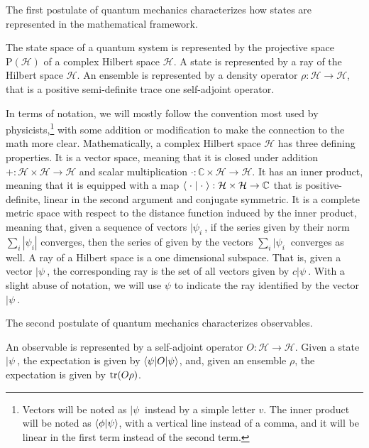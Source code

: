 The first postulate of quantum mechanics characterizes how states are represented in the mathematical framework.
\renewcommand{\thepostulate}{ST}
\begin{postulate}\label{rp_qm_postState}
	The state space of a quantum system is represented by the projective space $\mathrm{P}(\mathcal{H})$ of a complex Hilbert space $\mathcal{H}$. A state is represented by a ray of the Hilbert space $\mathcal{H}$. An ensemble is represented by a density operator $\rho : \mathcal{H} \to \mathcal{H}$, that is a positive semi-definite trace one self-adjoint operator.
\end{postulate}
\renewcommand{\thepostulate}{\Roman{assump}}
In terms of notation, we will mostly follow the convention most used by physicists,\footnote{Vectors will be noted as $|\psi\>$ instead by a simple letter $v$. The inner product will be noted as $\langle \phi | \psi \rangle $, with a vertical line instead of a comma, and it will be linear in the first term instead of the second term. } with some addition or modification to make the connection to the math more clear. Mathematically, a complex Hilbert space $\mathcal{H}$ has three defining properties. It is a vector space, meaning that it is closed under addition $+ : \mathcal{H} \times \mathcal{H} \to \mathcal{H}$ and scalar multiplication $\cdot : \mathbb{C} \times \mathcal{H} \to \mathcal{H}$. It has an inner product, meaning that it is equipped with a map $\langle \; \cdot \; | \; \cdot \; \rangle : \mathcal{H} \times \mathcal{H} \to \mathbb{C}$ that is positive-definite, linear in the second argument and conjugate symmetric. It is a complete metric space with respect to the distance function induced by the inner product, meaning that, given a sequence of vectors $|\psi_i\>$, if the series given by their norm $\sum_i |\psi_i|$ converges, then the series of given by the vectors $\sum_i |\psi_i\>$ converges as well. A ray of a Hilbert space is a one dimensional subspace. That is, given a vector $|\psi\>$, the corresponding ray is the set of all vectors given by $c |\psi\>$. With a slight abuse of notation, we will use $\psi$ to indicate the ray identified by the vector $|\psi\>$.

The second postulate of quantum mechanics characterizes observables.
\renewcommand{\thepostulate}{OBS}
\begin{postulate}\label{rp_qm_postObs}
	An observable is represented by a self-adjoint operator $O : \mathcal{H} \to \mathcal{H}$. Given a state $|\psi\>$, the expectation is given by $\langle\psi | O | \psi \rangle$, and, given an ensemble $\rho$, the expectation is given by $\operatorname{tr}(O\rho)$.
\end{postulate}
\renewcommand{\thepostulate}{\Roman{assump}}

